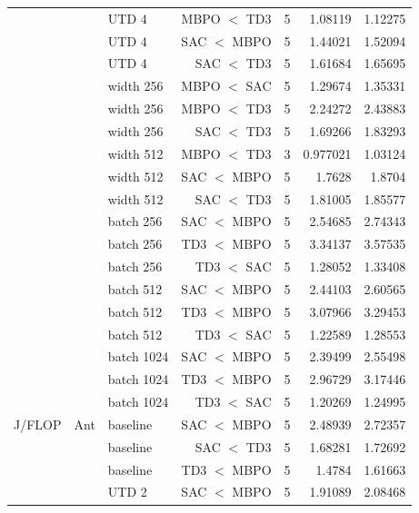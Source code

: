 {\begin{longtable}{@{}lllrrrr@{}}
     &  & UTD 4 & MBPO $<$ TD3 & \num{5} & \num{1.08119} & \num{1.12275} \\
     &  & UTD 4 & SAC $<$ MBPO & \num{5} & \num{1.44021} & \num{1.52094} \\
     &  & UTD 4 & SAC $<$ TD3 & \num{5} & \num{1.61684} & \num{1.65695} \\
     &  & width 256 & MBPO $<$ SAC & \num{5} & \num{1.29674} & \num{1.35331} \\
     &  & width 256 & MBPO $<$ TD3 & \num{5} & \num{2.24272} & \num{2.43883} \\
     &  & width 256 & SAC $<$ TD3 & \num{5} & \num{1.69266} & \num{1.83293} \\
     &  & width 512 & MBPO $<$ TD3 & \num{3} & \num{0.977021} & \num{1.03124} \\
     &  & width 512 & SAC $<$ MBPO & \num{5} & \num{1.7628} & \num{1.8704} \\
     &  & width 512 & SAC $<$ TD3 & \num{5} & \num{1.81005} & \num{1.85577} \\
     &  & batch 256 & SAC $<$ MBPO & \num{5} & \num{2.54685} & \num{2.74343} \\
     &  & batch 256 & TD3 $<$ MBPO & \num{5} & \num{3.34137} & \num{3.57535} \\
     &  & batch 256 & TD3 $<$ SAC & \num{5} & \num{1.28052} & \num{1.33408} \\
     &  & batch 512 & SAC $<$ MBPO & \num{5} & \num{2.44103} & \num{2.60565} \\
     &  & batch 512 & TD3 $<$ MBPO & \num{5} & \num{3.07966} & \num{3.29453} \\
     &  & batch 512 & TD3 $<$ SAC & \num{5} & \num{1.22589} & \num{1.28553} \\
     &  & batch 1024 & SAC $<$ MBPO & \num{5} & \num{2.39499} & \num{2.55498} \\
     &  & batch 1024 & TD3 $<$ MBPO & \num{5} & \num{2.96729} & \num{3.17446} \\
     &  & batch 1024 & TD3 $<$ SAC & \num{5} & \num{1.20269} & \num{1.24995} \\
    \midrule
    J/FLOP & Ant & baseline & SAC $<$ MBPO & \num{5} & \num{2.48939} & \num{2.72357} \\
     &  & baseline & SAC $<$ TD3 & \num{5} & \num{1.68281} & \num{1.72692} \\
     &  & baseline & TD3 $<$ MBPO & \num{5} & \num{1.4784} & \num{1.61663} \\
     &  & UTD 2 & SAC $<$ MBPO & \num{5} & \num{1.91089} & \num{2.08468} \\

\end{longtable}}
